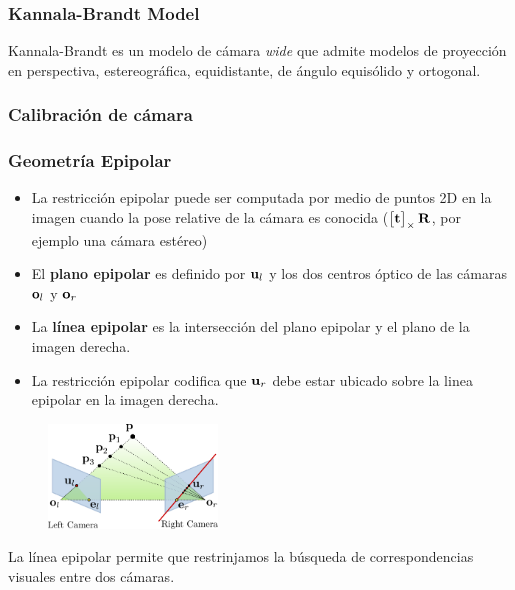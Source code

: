 \begin{frame}
    \frametitle{Kannala-Brandt Model}
    Kannala-Brandt es un modelo de cámara \emph{wide} que admite modelos de proyección en perspectiva, estereográfica, equidistante, de ángulo equisólido y ortogonal.


\end{frame}

\begin{frame}
    \frametitle{Calibración de cámara}
    \footnotesize
    

    
\end{frame}


\begin{frame}
    \frametitle{Geometría Epipolar}
    \footnotesize

    \begin{itemize}
        \item La restricción epipolar puede ser computada por medio de puntos 2D en la imagen cuando la pose relative de la cámara es conocida ($\begin{bmatrix}
            \boldsymbol{\mathbf{t}} 
        \end{bmatrix}_{\times} \boldsymbol{\mathbf{R}}$, por ejemplo una cámara estéreo)
        \item El \textbf{plano epipolar} es definido por $\boldsymbol{\mathbf{u}}_{l}$ y los dos centros óptico de las cámaras $\boldsymbol{\mathbf{o}}_{l}$ y $\boldsymbol{\mathbf{o}}_{r}$
        \item La \textbf{línea epipolar} es la intersección del plano epipolar y el plano de la imagen derecha.
        \item La restricción epipolar codifica que $\boldsymbol{\mathbf{u}}_{r}$ debe estar ubicado sobre la linea epipolar en la imagen derecha.
    \end{itemize}

    \begin{figure}
        \includegraphics[width=0.4\textwidth]{./images/epipolar_geometry.pdf}
    \end{figure}

    La línea epipolar permite que restrinjamos la búsqueda de correspondencias visuales entre dos cámaras.
\end{frame}

